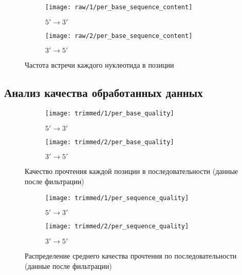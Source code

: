 \documentclass[main.tex]{subfiles}
\begin{document}
\begin{figure}[H]
    \centering
    \begin{subfigure}{.5\textwidth}
        \centering
        \texttt{[image: raw/1/per\_base\_sequence\_content]}
        \caption{$ 5' \to 3' $}
    \end{subfigure}%
    \begin{subfigure}{.5\textwidth}
        \centering
        \texttt{[image: raw/2/per\_base\_sequence\_content]}
        \caption{$ 3' \to 5' $}
    \end{subfigure}
    \caption{Частота встречи каждого нуклеотида в позиции }
    \label{fig:raw:sequence_content}
\end{figure}

\newpage
\subsection{Анализ качества обработанных данных}

\begin{figure}[H]
    \centering
    \begin{subfigure}{.5\textwidth}
        \centering
        \texttt{[image: trimmed/1/per\_base\_quality]}
        \caption{$ 5' \to 3' $}
    \end{subfigure}%
    \begin{subfigure}{.5\textwidth}
        \centering
        \texttt{[image: trimmed/2/per\_base\_quality]}
        \caption{$ 3' \to 5' $}
    \end{subfigure}
    \caption{Качество прочтения каждой позиции в последовательности (данные после фильтрации)}
    \label{fig:trimmed:per_base_q}
\end{figure}

\begin{figure}[H]
    \centering
    \begin{subfigure}{.5\textwidth}
        \centering
        \texttt{[image: trimmed/1/per\_sequence\_quality]}
        \caption{$ 5' \to 3' $}
    \end{subfigure}%
    \begin{subfigure}{.5\textwidth}
        \centering
        \texttt{[image: trimmed/2/per\_sequence\_quality]}
        \caption{$ 3' \to 5' $}
    \end{subfigure}
    \caption{Распределение среднего качества прочтения по последовательности (данные после фильтрации)}
    \label{fig:trimmed:across_reads_q}
\end{figure}
\end{document}
